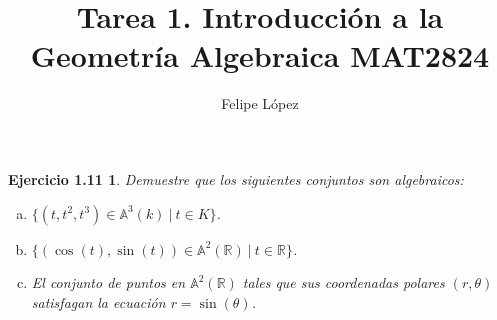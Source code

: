 \documentclass{amsart}
\title{Tarea 1. Introducción a la Geometría Algebraica MAT2824}
\author{Felipe López}
\theoremstyle{plain}
\newtheorem*{ejercicio1}{Ejercicio 1.11}
\newcommand{\R}{\mathbb{R}}
\begin{document}
	\maketitle

	\begin{ejercicio1}
		Demuestre que los siguientes conjuntos son algebraicos:
		\begin{enumerate}[a)]
			\item $\{(t, t^{2}, t^{3}) \in \mathbb{A}^{3}(k) \ | \ t \in K\}$.

			\item $\{(\cos(t), \sin(t)) \in \mathbb{A}^{2}(\R) \ | \ t \in \R\}$.

			\item El conjunto de puntos en $\mathbb{A}^{2}(\R)$ tales que sus coordenadas polares $(r,\theta)$ satisfagan la ecuación $r = \sin(\theta)$.
		\end{enumerate}
	\end{ejercicio1}
\end{document}
